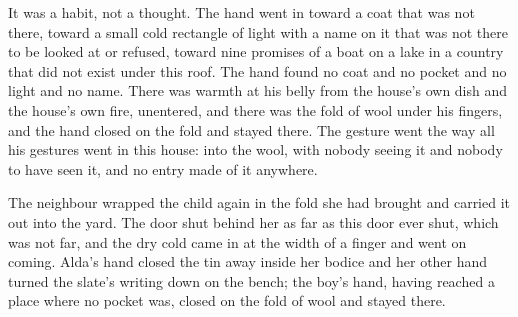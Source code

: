 It was a habit, not a thought. The hand went in toward a coat that was not there, toward a small cold rectangle of light with a name on it that was not there to be looked at or refused, toward nine promises of a boat on a lake in a country that did not exist under this roof. The hand found no coat and no pocket and no light and no name. There was warmth at his belly from the house's own dish and the house's own fire, unentered, and there was the fold of wool under his fingers, and the hand closed on the fold and stayed there. The gesture went the way all his gestures went in this house: into the wool, with nobody seeing it and nobody to have seen it, and no entry made of it anywhere.

The neighbour wrapped the child again in the fold she had brought and carried it out into the yard. The door shut behind her as far as this door ever shut, which was not far, and the dry cold came in at the width of a finger and went on coming. Alda's hand closed the tin away inside her bodice and her other hand turned the slate's writing down on the bench; the boy's hand, having reached a place where no pocket was, closed on the fold of wool and stayed there.
